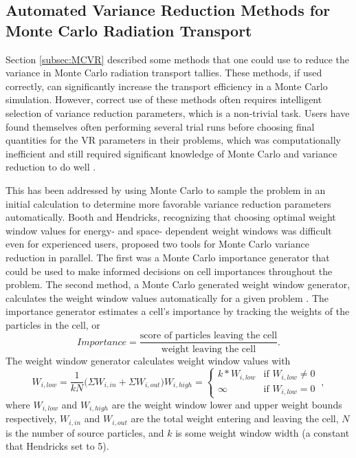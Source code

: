 \subsection{Automated Variance Reduction Methods for Monte Carlo Radiation
Transport}
\label{subsec:AutomatedMCVR}

Section \ref{subsec:MCVR} described some methods that one could use to reduce the
variance in Monte Carlo radiation transport tallies. These methods, if used
correctly, can significantly increase the transport efficiency in a Monte Carlo
simulation. However, correct use of these methods often requires intelligent
selection of variance reduction parameters, which is a non-trivial task. Users have
found themselves often performing several trial runs before choosing final
quantities for the VR parameters in their problems, which was computationally
inefficient and still required significant knowledge of Monte Carlo and variance
reduction to do well \cite{booth_automatic_1982}.

This has been addressed by using Monte Carlo to sample the problem in an initial
calculation to determine more favorable variance reduction parameters automatically.
Booth and Hendricks,
recognizing that choosing optimal weight window values for energy- and space-
dependent weight windows was difficult even for experienced users, proposed two
tools for Monte Carlo variance reduction in parallel. The first was a
Monte Carlo importance generator \cite{booth_automatic_1982} that could be used
to make informed decisions on cell importances throughout the problem. The
second method, a Monte Carlo generated weight window generator,
calculates the weight window values automatically for a given problem
\cite{hendricks_code-generated_1982}.
The importance generator estimates a cell's importance
by tracking the weights of the particles in the cell, or
\begin{equation}
  Importance  = \frac{\text{score of particles leaving the cell}}
                     {\text{weight leaving the cell}}.
\label{eq:BoothImp}
\end{equation}
The weight window generator calculates weight window values with
\begin{subequations}
\begin{equation}
  W_{i,low} = \frac{1}{kN}\big(\Sigma W_{i,in} + \Sigma W_{i,out} \big)
\end{equation}
\begin{equation}
  W_{i,high} =
  \begin{cases}
    k*W_{i,low} & \text{if } W_{i,low} \neq 0 \\
    \infty & \text{if } W_{i,low} = 0
  \end{cases}  \:,
  \label{eq:hendricksWW}
\end{equation}
\end{subequations}
where $W_{i,low}$ and $W_{i,high}$ are the weight window lower and upper weight
bounds respectively, $W_{i,in}$ and $W_{i,out}$ are the total weight entering
and leaving the cell, $N$ is the number of source particles, and $k$ is some weight
window width (a constant that Hendricks set to 5). 

